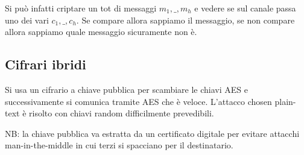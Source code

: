 Si può infatti criptare un tot di messaggi $m_1, \_, m_h$ e vedere se sul canale passa uno dei vari $c_1, \_, c_h$. Se compare allora sappiamo il messaggio, se non compare allora sappiamo quale messaggio sicuramente non è.

\subsection{Cifrari ibridi}
Si usa un cifrario a chiave pubblica per scambiare le chiavi AES e successivamente si comunica tramite AES che è veloce. L'attacco chosen plain-text è risolto con chiavi random difficilmente prevedibili.

NB: la chiave pubblica va estratta da un certificato digitale per evitare attacchi man-in-the-middle in cui terzi si spacciano per il destinatario.